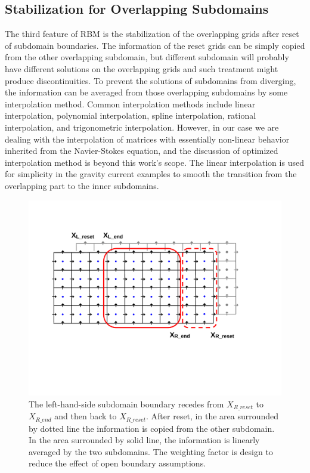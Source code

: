 \subsection{Stabilization for Overlapping Subdomains}
\label{chapter:RBM-Smoothing}

The third feature of RBM is the stabilization of the overlapping grids after reset of subdomain boundaries. The information of the reset grids can be simply copied from the other overlapping subdomain, but different subdomain will probably have different solutions on the overlapping grids and such treatment might produce discontinuities. To prevent the solutions of subdomains from diverging, the information can be averaged from those overlapping subdomains by some interpolation method. Common interpolation methods include linear interpolation, polynomial interpolation, spline interpolation, rational interpolation, and trigonometric interpolation. However, in our case we are dealing with the interpolation of matrices with essentially non-linear behavior inherited from the Navier-Stokes equation, and the discussion of optimized interpolation method is beyond this work's scope. The linear interpolation is used for simplicity in the gravity current examples to smooth the transition from the overlapping part to the inner subdomains.

\begin{figure}[htbp]
  \begin{center}
\includegraphics[scale=0.4]{../figures/RBM-step3.pdf}
   \caption{The left-hand-side subdomain boundary recedes from $X_{R\_reset}$ to $X_{R\_end}$ and then back to $X_{R\_reset}$. After reset, in the area surrounded by dotted line the information is copied from the other subdomain. In the area surrounded by solid line, the information is linearly averaged by the two subdomains. The weighting factor is design to reduce the effect of open boundary assumptions. }
    \label{fig:RBM-step3}
  \end{center}
\end{figure}

